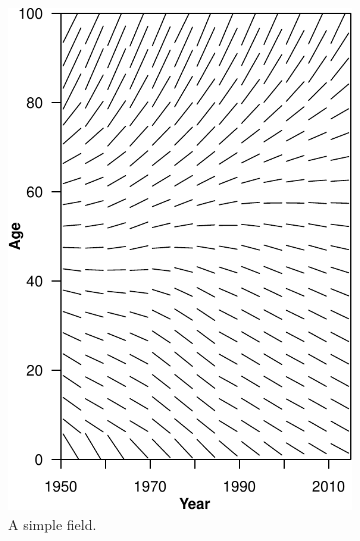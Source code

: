 \documentclass{article}
\begin{document}
\begin{figure}
\begin{subfigure}{.5\textwidth}
  \centering
  \includegraphics[scale=.6]{Figures/Fig9-crop.pdf}
  \caption{A simple field.}
  \label{fig:sfig1}
\end{subfigure}%
\begin{subfigure}{.5\textwidth}
  \centering

\end{subfigure}
\end{figure}
\end{document}
